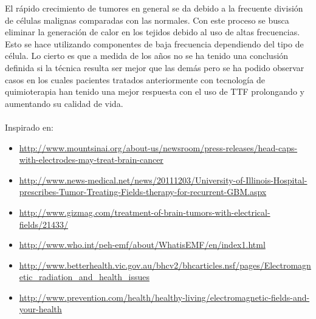 \documentclass[paper=a4, fontsize=11pt]{scrartcl} %
\begin{document}
El r\'apido crecimiento de tumores en general se da debido a la frecuente divisi\'on de c\'elulas malignas comparadas con las normales.   Con este proceso se busca eliminar la generaci\'on de calor en los tejidos debido al uso de altas frecuencias. Esto se hace utilizando componentes de baja frecuencia dependiendo del tipo de c\'elula. Lo cierto es que a medida de los a\~nos no se ha tenido una conclusi\'on definida si la t\'ecnica resulta ser mejor que las dem\'as pero se ha podido observar casos en los cuales pacientes tratados anteriormente con tecnolog\'ia de quimioterapia han tenido una mejor respuesta con el uso de TTF prolongando y aumentando su calidad de vida.\\
\\

Inspirado en:
	\begin{itemize}
		\item \sloppy \url {http://www.mountsinai.org/about-us/newsroom/press-releases/head-caps-with-electrodes-may-treat-brain-cancer}

		\item \url {http://www.news-medical.net/news/20111203/University-of-Illinois-Hospital-prescribes-Tumor-Treating-Fields-therapy-for-recurrent-GBM.aspx}

		\item \url{http://www.gizmag.com/treatment-of-brain-tumors-with-electrical-fields/21433/}

		\item \url{http://www.who.int/peh-emf/about/WhatisEMF/en/index1.html}

		\item \url{http://www.betterhealth.vic.gov.au/bhcv2/bhcarticles.nsf/pages/Electromagnetic_radiation_and_health_issues}

		\item \url{http://www.prevention.com/health/healthy-living/electromagnetic-fields-and-your-health}
		
	\end{itemize}
\end{document}
